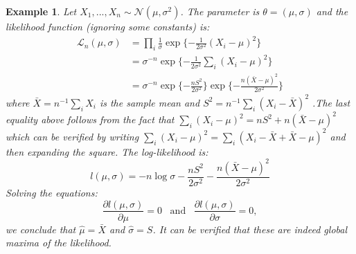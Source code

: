 \documentclass[twoside]{article}
\newcounter{lecnum}
\newtheorem{example}{Example}[lecnum]
\begin{document}
\begin{example}
Let $X_1,...,X_n \sim \mathcal{N}(\mu, \sigma^2)$. The parameter is $\theta = (\mu, \sigma)$ and the likelihood function (ignoring some constants) is:
\begin{equation*}
\begin{aligned}
    \mathcal{L}_n(\mu, \sigma) &= \prod\limits_{i}\frac{1}{\sigma}\exp{\{-\frac{1}{2\sigma^2}(X_i - \mu)^2\}}\\
    &= \sigma^{-n}\exp{\{-\frac{1}{2\sigma^2}\sum\limits_i(X_i - \mu)^2\}}\\
    &= \sigma^{-n}\exp{\{-\frac{nS^2}{2\sigma^2}\}}\exp{\{-\frac{n(\bar{X} - \mu)^2}{2\sigma^2}\}}
\end{aligned}
\end{equation*}
where $\bar{X} = n^{-1}\sum\limits_i X_i$ is the sample mean and $S^2 = n^{-1}\sum\limits_i(X_i - \bar{X})^2$ .The
last equality above follows from the fact that $\sum\limits_i(X_i - \mu)^2 = nS^2 + n(\bar{X} - \mu)^2$
which can be verified by writing $\sum\limits_i(X_i - \mu)^2 = \sum\limits_i(X_i - \bar{X} + \bar{X} -\mu)^2$ and then expanding the square. The log-likelihood is:
\begin{equation*}
    l(\mu, \sigma) = -n\log\sigma - \frac{nS^2}{2\sigma^2} - \frac{n(\bar{X} - \mu)^2}{2\sigma^2}
\end{equation*}
Solving the equations:
\begin{equation*}
\frac{\partial l(\mu, \sigma)}{\partial\mu} = 0 \hspace{10pt} \text{and} \hspace{10pt} \frac{\partial l(\mu, \sigma)}{\partial\sigma} = 0,
\end{equation*}
we conclude that $\hat{\mu} = \bar{X}$ and $\hat{\sigma} = S$. It can be verified that these are indeed global maxima of the likelihood.
\end{example}
\end{document}
